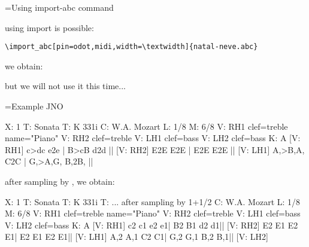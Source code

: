 \documentclass{article}
\begin{document}
=Using import-abc command

using import is possible:

\begin{Verbatim}
\import_abc[pin=odot,midi,width=\textwidth]{natal-neve.abc}
\end{Verbatim}
we obtain:

but we will not use it this time...

=Example JNO

\medskip

\begin{_abc}[mp3,width=0.9\textwidth]
X: 1 
T: Sonata
T: K 331i
C: W.A. Mozart
L: 1/8
M: 6/8
V: RH1 clef=treble name="Piano" 
V: RH2 clef=treble 
V: LH1 clef=bass 
V: LH2 clef=bass 
K: A
[V: RH1] c>dc e2e | B>cB d2d ||
[V: RH2] E2E E2E | E2E E2E ||
[V: LH1] A,>B,A, C2C | G,>A,G, B,2B, ||
\end{_abc}

after sampling by
, we obtain:

\begin{_abc}[midi,width=0.9\textwidth]
X: 1
T: Sonata
T: K 331i
T: ... after sampling by 1+1/2
C: W.A. Mozart
L: 1/8
M: 6/8
V: RH1 clef=treble name="Piano" 
V: RH2 clef=treble 
V: LH1 clef=bass 
V: LH2 clef=bass 
K: A
% 
[V: RH1] c2 c1 e2 e1| B2 B1 d2 d1||
[V: RH2] E2 E1 E2 E1| E2 E1 E2 E1||
[V: LH1] A,2 A,1 C2 C1| G,2 G,1 B,2 B,1||
[V: LH2] 
\end{_abc}
\end{document}
